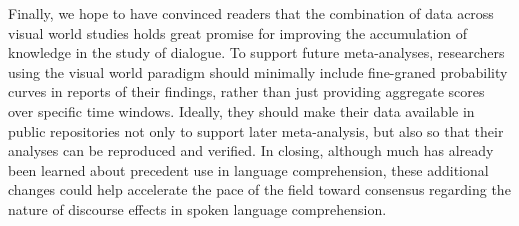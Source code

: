 \documentclass[doc,fignum,apacite,floatsintext]{apa6}
\begin{document}



Finally, we hope to have convinced readers that the combination of data across visual world studies holds great promise for improving the accumulation of knowledge in the study of dialogue.  To support future meta-analyses, researchers using the visual world paradigm should minimally include fine-graned probability curves in reports of their findings, rather than just providing aggregate scores over specific time windows.  Ideally, they should make their data available in public repositories not only to support later meta-analysis, but also so that their analyses can be reproduced and verified.  In closing, although much has already been learned about precedent use in language comprehension, these additional changes could help accelerate the pace of the field toward consensus regarding the nature of discourse effects in spoken language comprehension.


\end{document}
